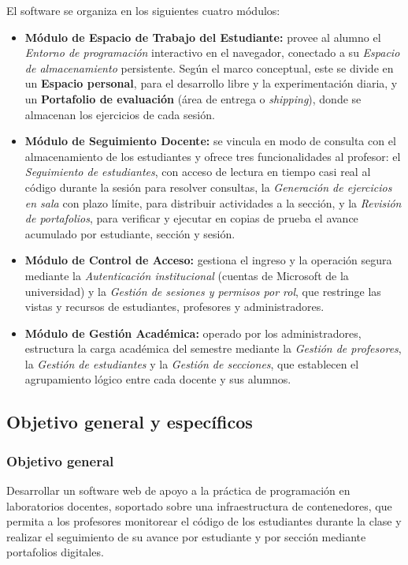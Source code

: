 El software se organiza en los siguientes cuatro módulos:
\begin{itemize}
    \item \textbf{Módulo de Espacio de Trabajo del Estudiante:} provee al alumno el \textit{Entorno de programación} interactivo en el navegador, conectado a su \textit{Espacio de almacenamiento} persistente. Según el marco conceptual, este se divide en un \textbf{Espacio personal}, para el desarrollo libre y la experimentación diaria, y un \textbf{Portafolio de evaluación} (área de entrega o \textit{shipping}), donde se almacenan los ejercicios de cada sesión.
    \item \textbf{Módulo de Seguimiento Docente:} se vincula en modo de consulta con el almacenamiento de los estudiantes y ofrece tres funcionalidades al profesor: el \textit{Seguimiento de estudiantes}, con acceso de lectura en tiempo casi real al código durante la sesión para resolver consultas, la \textit{Generación de ejercicios en sala} con plazo límite, para distribuir actividades a la sección, y la \textit{Revisión de portafolios}, para verificar y ejecutar en copias de prueba el avance acumulado por estudiante, sección y sesión.
    \item \textbf{Módulo de Control de Acceso:} gestiona el ingreso y la operación segura mediante la \textit{Autenticación institucional} (cuentas de Microsoft de la universidad) y la \textit{Gestión de sesiones y permisos por rol}, que restringe las vistas y recursos de estudiantes, profesores y administradores.
    \item \textbf{Módulo de Gestión Académica:} operado por los administradores, estructura la carga académica del semestre mediante la \textit{Gestión de profesores}, la \textit{Gestión de estudiantes} y la \textit{Gestión de secciones}, que establecen el agrupamiento lógico entre cada docente y sus alumnos.
\end{itemize}


\subsection{Objetivo general y específicos}
\label{subsec:objetivos}

\subsubsection*{Objetivo general}
Desarrollar un software web de apoyo a la práctica de programación en laboratorios docentes, soportado sobre una infraestructura de contenedores, que permita a los profesores monitorear el código de los estudiantes durante la clase y realizar el seguimiento de su avance por estudiante y por sección mediante portafolios digitales.

